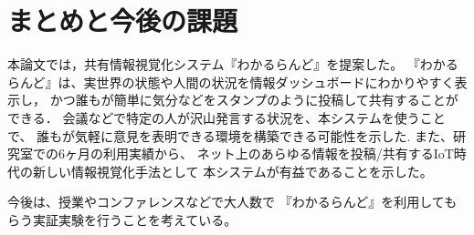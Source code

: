\section{まとめと今後の課題}
本論文では，共有情報視覚化システム『わかるらんど』を提案した。
『わかるらんど』は、実世界の状態や人間の状況を情報ダッシュボードにわかりやすく表示し，
かつ誰もが簡単に気分などをスタンプのように投稿して共有することができる．
会議などで特定の人が沢山発言する状況を、本システムを使うことで、
誰もが気軽に意見を表明できる環境を構築できる可能性を示した.
また、研究室での6ヶ月の利用実績から、
ネット上のあらゆる情報を投稿/共有するIoT時代の新しい情報視覚化手法として
本システムが有益であることを示した。

今後は、授業やコンファレンスなどで大人数で
『わかるらんど』を利用してもらう実証実験を行うことを考えている。